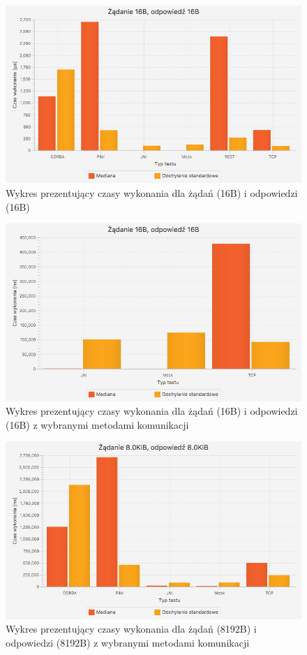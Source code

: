 \begin{figure}[H]
    \centering
    \includegraphics[scale=0.36]{img/charts/chart_16_16.png}
    \caption{Wykres prezentujący czasy wykonania dla żądań (16B) i odpowiedzi (16B)}
    \label{fig:chart_16_16}
\end{figure}

\begin{figure}[H]
	\centering
	\includegraphics[scale=0.36]{img/charts/chart_16_16_removed.png}
	\caption{Wykres prezentujący czasy wykonania dla żądań (16B) i odpowiedzi (16B) z wybranymi metodami komunikacji}
	\label{fig:chart_16_16_removed}
\end{figure}

\begin{figure}[H]
	\centering
	\includegraphics[scale=0.36]{img/charts/chart_8192_8192_removed.png}
	\caption{Wykres prezentujący czasy wykonania dla żądań (8192B) i odpowiedzi (8192B) z wybranymi metodami komunikacji}
	\label{fig:chart_8192_8192_removed}
\end{figure}

